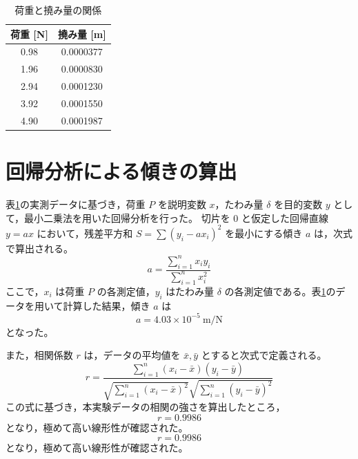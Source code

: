 \documentclass[10pt,a4paper,titlepage]{jreport}
\begin{document}
\begin{table}[H]
\centering
\caption{荷重と撓み量の関係}
\label{tab:load_deflection}

\begin{tabular}{|c|c|}
\hline
荷重 [N] & 撓み量 [m] \\ \hline

0.98 & 0.0000377 \\ \hline
1.96 & 0.0000830 \\ \hline
2.94 & 0.0001230 \\ \hline
3.92 & 0.0001550 \\ \hline
4.90 & 0.0001987 \\ \hline

\end{tabular}
\end{table}

\section{回帰分析による傾きの算出}

表\ref{tab:load_deflection}の実測データに基づき，荷重 $P$ を説明変数 $x$，たわみ量 $\delta$ を目的変数 $y$ として，最小二乗法を用いた回帰分析を行った。
切片を $0$ と仮定した回帰直線 $y = ax$ において，残差平方和 $S = \sum (y_i - ax_i)^2$ を最小にする傾き $a$ は，次式で算出される。
\begin{equation}
    a = \frac{\sum_{i=1}^{n} x_i y_i}{\sum_{i=1}^{n} x_i^2}
\end{equation}
ここで，$x_i$ は荷重 $P$ の各測定値，$y_i$ はたわみ量 $\delta$ の各測定値である。表\ref{tab:load_deflection}のデータを用いて計算した結果，傾き $a$ は
\begin{equation}
    a = 4.03 \times 10^{-5}\ \mathrm{m/N}
\end{equation}
となった。

また，相関係数 $r$ は，データの平均値を $\bar{x}, \bar{y}$ とすると次式で定義される。
\begin{equation}
    r = \frac{\sum_{i=1}^{n} (x_i - \bar{x})(y_i - \bar{y})}{\sqrt{\sum_{i=1}^{n} (x_i - \bar{x})^2} \sqrt{\sum_{i=1}^{n} (y_i - \bar{y})^2}}
\end{equation}
この式に基づき，本実験データの相関の強さを算出したところ，
\begin{equation}
    r = 0.9986
\end{equation}
となり，極めて高い線形性が確認された。
\begin{equation}
    r = 0.9986
\end{equation}
となり，極めて高い線形性が確認された。
\end{document}
